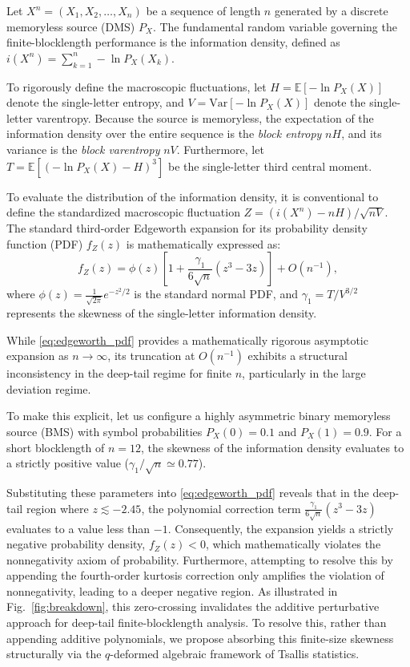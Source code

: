 \documentclass[conference]{IEEEtran}
\begin{document}
Let $X^n = (X_1, X_2, \dots, X_n)$ be a sequence of length $n$ generated by a discrete memoryless source (DMS) $P_X$. The fundamental random variable governing the finite-blocklength performance is the information density, defined as $i(X^n) = \sum_{k=1}^n -\ln P_X(X_k)$. 

To rigorously define the macroscopic fluctuations, let $H = \mathbb{E}[-\ln P_X(X)]$ denote the single-letter entropy, and $V = \mathrm{Var}[-\ln P_X(X)]$ denote the single-letter varentropy. Because the source is memoryless, the expectation of the information density over the entire sequence is the \textit{block entropy} $nH$, and its variance is the \textit{block varentropy} $nV$. Furthermore, let $T = \mathbb{E}[(-\ln P_X(X) - H)^3]$ be the single-letter third central moment.

To evaluate the distribution of the information density, it is conventional to define the standardized macroscopic fluctuation $Z = (i(X^n) - nH)/\sqrt{nV}$. The standard third-order Edgeworth expansion for its probability density function (PDF) $f_Z(z)$ is mathematically expressed as:
\begin{equation}
    f_Z(z) = \phi(z) \left[ 1 + \frac{\gamma_1}{6\sqrt{n}} (z^3 - 3z) \right] + O(n^{-1}),
    \label{eq:edgeworth_pdf}
\end{equation}
where $\phi(z) = \frac{1}{\sqrt{2\pi}}e^{-z^2/2}$ is the standard normal PDF, and $\gamma_1 = T/V^{3/2}$ represents the skewness of the single-letter information density.

While \eqref{eq:edgeworth_pdf} provides a mathematically rigorous asymptotic expansion as $n \to \infty$, its truncation at $O(n^{-1})$ exhibits a structural inconsistency in the deep-tail regime for finite $n$, particularly in the large deviation regime.

To make this explicit, let us configure a highly asymmetric binary memoryless source (BMS) with symbol probabilities $P_X(0) = 0.1$ and $P_X(1) = 0.9$. 
For a short blocklength of $n=12$, the skewness of the information density evaluates to a strictly positive value ($\gamma_1 / \sqrt{n} \simeq 0.77$). 

Substituting these parameters into \eqref{eq:edgeworth_pdf} reveals that in the deep-tail region where $z \lesssim -2.45$, the polynomial correction term $\frac{\gamma_1}{6\sqrt{n}} (z^3 - 3z)$ evaluates to a value less than $-1$. 
Consequently, the expansion yields a strictly negative probability density, $f_Z(z) < 0$, which mathematically violates the nonnegativity axiom of probability. Furthermore, attempting to resolve this by appending the fourth-order kurtosis correction only amplifies the violation of nonnegativity, leading to a deeper negative region. As illustrated in Fig.~\ref{fig:breakdown}, this zero-crossing invalidates the additive perturbative approach for deep-tail finite-blocklength analysis. To resolve this, rather than appending additive polynomials, we propose absorbing this finite-size skewness structurally via the $q$-deformed algebraic framework of Tsallis statistics.
\end{document}
